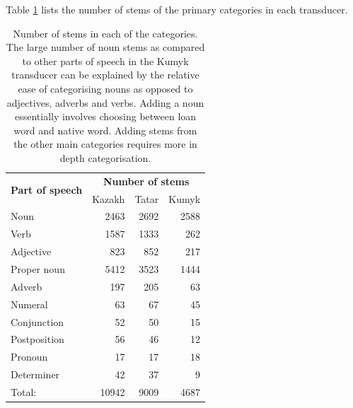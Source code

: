 \documentclass[a4paper,11pt,twocolumn]{article}
\begin{document}

Table \ref{table:stems} lists the number of stems of the primary categories in each transducer.

\begin{table}
\begin{center}
\begin{tabular}{lrrr}
		\toprule
\multirow{2}{*}{\textbf{Part of speech}} & \multicolumn{3}{c}{\textbf{Number of stems}} \\ \cline{2-4}
                        & Kazakh & Tatar & Kumyk \\
		\midrule
		Noun & 2463 & 2692 & 2588 \\
		Verb & 1587 & 1333 & 262 \\
		Adjective & 823 & 852 & 217 \\
		Proper noun & 5412 & 3523 & 1444 \\
		Adverb & 197 & 205 & 63 \\
		Numeral & 63 & 67 & 45 \\
		Conjunction & 52 & 50 & 15 \\
		Postposition & 56 & 46 & 12 \\
		Pronoun & 17 & 17 & 18 \\
		Determiner & 42 & 37 & 9 \\
		\midrule
		Total: & 10942 & 9009 & 4687 \\
		\bottomrule
\end{tabular}
 \caption{Number of stems in each of the categories. The large number of noun stems as compared
    to other parts of speech in the Kumyk transducer can be explained by the relative ease of 
    categorising nouns as opposed to adjectives, adverbs and verbs. Adding a noun essentially involves
    choosing between loan word and native word. Adding stems from the other main categories 
    requires more in depth categorisation.}
 \label{table:stems}
\end{center}

\end{table}

\end{document}
